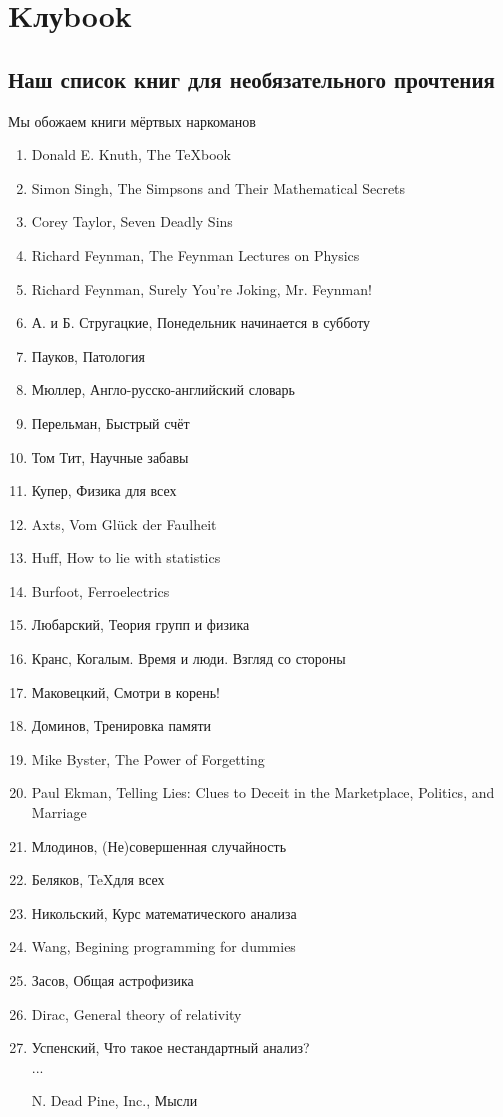 \section*{Kлуbook} 
\subsection*{Наш список книг для необязательного прочтения} %
\begin{epigraph}
    Мы обожаем книги мёртвых наркоманов
\end{epigraph}

\begin{enumerate}
    \item Donald E. Knuth, The {\TeX}book
    \item Simon Singh, The Simpsons and Their Mathematical Secrets
    \item Corey Taylor, Seven Deadly Sins 
    \item Richard Feynman, The Feynman Lectures on Physics
    \item Richard Feynman, Surely You're Joking, Mr. Feynman!
    \item А. и Б. Стругацкие, Понедельник начинается в субботу
    \item Пауков, Патология
    \item Мюллер, Англо-русско-английский словарь
    \item Перельман, Быстрый счёт
    \item Том Тит, Научные забавы
    \item Купер, Физика для всех
    \item Axts,  Vom Gl\"uck der Faulheit 
    \item Huff, How to lie with statistics
    \item Burfoot, Ferroelectrics
    \item Любарский, Теория групп и физика
    \item Кранс, Когалым. Время и люди. Взгляд со стороны
    \item Маковецкий, Смотри в корень!
    \item Доминов, Тренировка памяти
    \item Mike Byster, The Power of Forgetting
    \item Paul Ekman, Telling Lies: Clues to Deceit in the Marketplace, Politics, and Marriage
    \item Млодинов, (Не)совершенная случайность
    \item Беляков, \TeX для всех
    \item Никольский, Курс математического анализа
    \item Wang, Begining programming for dummies
    \item Засов, Общая астрофизика
    \item Dirac, General theory of relativity
    \item Успенский, Что такое нестандартный анализ?\\
    ...
    \item[N.] Dead Pine, Inc., Мысли
\end{enumerate}

